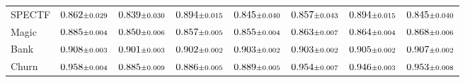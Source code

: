\begin{table}[!t]
{\begin{tabular}{lccccccc}
SPECTF & $0.862 \text{\scriptsize$\pm$0.029}$ & $0.839 \text{\scriptsize$\pm$0.030}$ & $0.894 \text{\scriptsize$\pm$0.015}$ & $0.845 \text{\scriptsize$\pm$0.040}$ & $0.857 \text{\scriptsize$\pm$0.043}$ & $0.894 \text{\scriptsize$\pm$0.015}$ & $0.845 \text{\scriptsize$\pm$0.040}$ \\
Magic & $0.885 \text{\scriptsize$\pm$0.004}$ & $0.850 \text{\scriptsize$\pm$0.006}$ & $0.857 \text{\scriptsize$\pm$0.005}$ & $0.855 \text{\scriptsize$\pm$0.004}$ & $0.863 \text{\scriptsize$\pm$0.007}$ & $0.864 \text{\scriptsize$\pm$0.004}$ & $0.868 \text{\scriptsize$\pm$0.006}$ \\
Bank & $0.908 \text{\scriptsize$\pm$0.003}$ & $0.901 \text{\scriptsize$\pm$0.003}$ & $0.902 \text{\scriptsize$\pm$0.002}$ & $0.903 \text{\scriptsize$\pm$0.002}$ & $0.903 \text{\scriptsize$\pm$0.002}$ & $0.905 \text{\scriptsize$\pm$0.002}$ & $0.907 \text{\scriptsize$\pm$0.002}$ \\
Churn & $0.958 \text{\scriptsize$\pm$0.004}$ & $0.885 \text{\scriptsize$\pm$0.009}$ & $0.886 \text{\scriptsize$\pm$0.005}$ & $0.889 \text{\scriptsize$\pm$0.005}$ & $0.954 \text{\scriptsize$\pm$0.007}$ & $0.946 \text{\scriptsize$\pm$0.003}$ & $0.953 \text{\scriptsize$\pm$0.008}$ \\
\bottomrule
\end{tabular}
}
\end{table}


